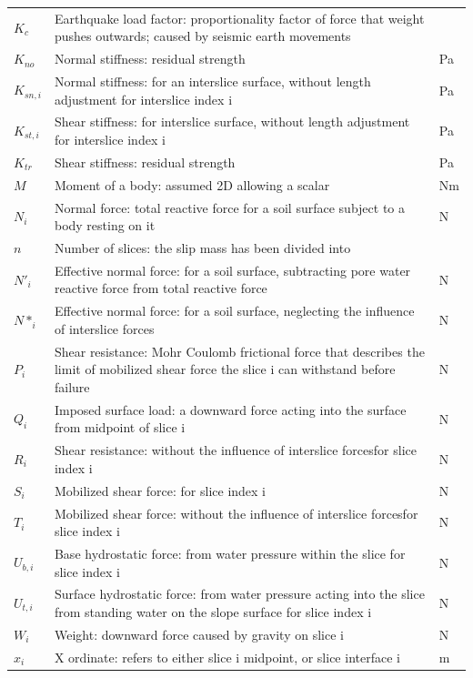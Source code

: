 \documentclass[12pt]{article}
\begin{document}
\begin{longtable*}{l l l}
\\
$K_{c}$ & Earthquake load factor: proportionality factor of force that weight pushes outwards; caused by seismic earth movements & 
\\
$K_{no}$ & Normal stiffness: residual strength & Pa
\\
$K_{sn,i}$ & Normal stiffness: for an interslice surface, without length adjustment for interslice index i & Pa
\\
$K_{st,i}$ & Shear stiffness: for interslice surface, without length adjustment for interslice index i & Pa
\\
$K_{tr}$ & Shear stiffness: residual strength & Pa
\\
$M$ & Moment of a body: assumed 2D allowing a scalar & Nm
\\
$N_{i}$ & Normal force: total reactive force for a soil surface subject to a body resting on it & N
\\
$n$ & Number of slices: the slip mass has been divided into & 
\\
$N'_{i}$ & Effective normal force: for a soil surface, subtracting pore water reactive force from total reactive force & N
\\
$N*_{i}$ & Effective normal force: for a soil surface, neglecting the influence of interslice forces & N
\\
$P_{i}$ & Shear resistance: Mohr Coulomb frictional force that describes the limit of mobilized shear force the slice i can withstand before failure & N
\\
$Q_{i}$ & Imposed surface load: a downward force acting into the surface from midpoint of slice i & N
\\
$R_{i}$ & Shear resistance: without the influence of interslice forcesfor slice index i & N
\\
$S_{i}$ & Mobilized shear force: for slice index i & N
\\
$T_{i}$ & Mobilized shear force: without the influence of interslice forcesfor slice index i & N
\\
$U_{b,i}$ & Base hydrostatic force: from water pressure within the slice for slice index i & N
\\
$U_{t,i}$ & Surface hydrostatic force: from water pressure acting into the slice from standing water on the slope surface for slice index i & N
\\
$W_{i}$ & Weight: downward force caused by gravity on slice i & N
\\
$x_{i}$ & X ordinate: refers to either slice i midpoint, or slice interface i & m

\end{longtable*}
\end{document}
